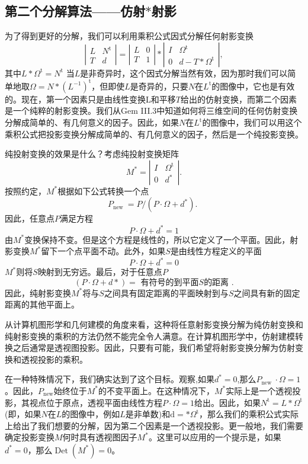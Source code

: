 \subsection*{第二个分解算法——仿射$*$射影}
为了得到更好的分解，我们可以利用乘积公式因式分解任何射影变换
$$
\left|\begin{array}{cc}
L & N^{\mathrm{t}} \\
T & d
\end{array}\right|=\left|\begin{array}{cc}
L & 0 \\
T & 1
\end{array}\right| *\left|\begin{array}{cc}
I & \Omega^{\mathrm{t}} \\
0 & d-T * \Omega^{\mathrm{t}}
\end{array}\right|,
$$
其中$L *\Omega^{\mathrm{t}}=N^{\mathrm{t}}$ 当$L$是非奇异时，这个因式分解当然有效，因为那时我们可以简单地取$\Omega=N *\left(L^{-1}\right)^{\mathrm{t}}$，但即使$L$是奇异的，只要$N$在$L^{\mathrm{t}}$的图像中，它也是有效的。现在，第一个因素只是由线性变换L和平移$T$给出的仿射变换，而第二个因素是一个纯粹的射影变换。我们从Gem III.3中知道如何将三维空间的任何仿射变换分解成简单的、有几何意义的因子。因此，如果$N$在$L^{\mathrm{t}}$的图像中，我们可以用这个乘积公式把投影变换分解成简单的、有几何意义的因子，然后是一个纯投影变换。

纯投射变换的效果是什么？考虑纯投射变换矩阵
$$
M^{*}=\left|\begin{array}{cc}
I & \Omega^{\mathrm{t}} \\
0 & d^{*}
\end{array}\right| .
$$
按照约定，$M^{*}$根据如下公式转换一个点
$$
P_{\text {new }}=P /\left(P \cdot \Omega+d^{*}\right) \text {. }
$$
因此，任意点$P$满足方程
$$
P \cdot \Omega+d^{*}=1
$$
由$M^{*}$变换保持不变。但是这个方程是线性的，所以它定义了一个平面。因此，射影变换$M^{*}$留下一个点平面不动。此外，如果$S$是由线性方程定义的平面
$$
P \cdot \Omega+d^{*}=0
$$
$M^{*}$则将$S$映射到无穷远。最后，对于任意点$P$
$$
(P \cdot \Omega+d *)=\text { 有符号的到平面}S\text{的距离 }.
$$
因此，纯射影变换$M^{*}$将与$S$之间具有固定距离的平面映射到与$S$之间具有新的固定距离的其他平面上。

从计算机图形学和几何建模的角度来看，这种将任意射影变换分解为纯仿射变换和纯射影变换的乘积的方法仍然不能完全令人满意。在计算机图形学中，仿射建模转换之后通常是透视图投影。因此，只要有可能，我们希望将射影变换分解为仿射变换和透视投影的乘积。

在一种特殊情况下，我们确实达到了这个目标。观察,如果$d^{*}=0$,那么$P_{\text {new }} \cdot \Omega=1$。因此，$P_{\text {new}}$始终位于$M^{*}$的不变平面上。在这种情况下，$M^{*}$实际上是一个透视投影，其视点位于原点，透视平面由线性方程$P \cdot \Omega=1$给出。因此，如果$N^{\mathrm{t}}=L * \Omega^{\mathrm{t}}$(即，如果$N$在$L$的图像中，例如$L$是非单数)和$\mathrm{d}=* \Omega^{\mathrm{t}}$，那么我们的乘积公式实际上给出了我们想要的分解，因为第二个因素是一个透视投影。更一般地，我们需要确定投影变换$M$何时具有透视图因子$M^{*}$。这里可以应用的一个提示是，如果$d^{*}=0$，那么$\operatorname{Det}\left(M^{*}\right)=0$。

